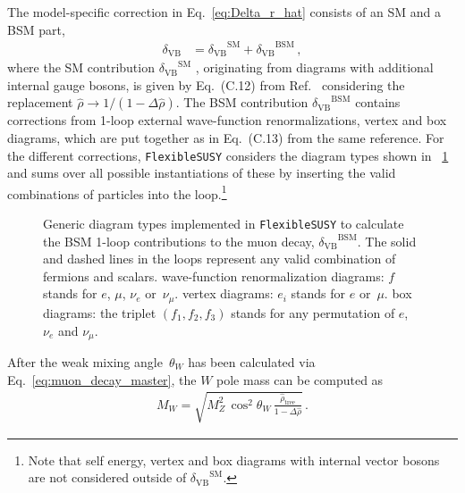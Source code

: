 \documentclass[final,3p,11pt,pdflatex]{elsarticle}
\makeatletter
\newcommand{\fs}{\texttt{FlexibleSUSY}\@\xspace}
\newcommand{\SM}{\ensuremath{\text{SM}}\xspace}
\newcommand{\BSM}{\ensuremath{\text{BSM}}\xspace}
\newcommand{\deltaVB}{\ensuremath{\delta_{\text{VB}}}\xspace}
\newcommand{\figref}[1]{\figurename~\ref{#1}}
\makeatother
\begin{document}
The model-specific correction in Eq.~\eqref{eq:Delta_r_hat}
consists of an SM and a BSM part,
%
\begin{align}
   \deltaVB &= \deltaVB^\SM + \deltaVB^\BSM\,,
\end{align}
%
where the SM contribution $\deltaVB^\SM$
\cite{Degrassi:1990tu}, originating
from diagrams with additional internal gauge bosons, is given by
Eq.~(C.12) from Ref.~\cite{Pierce:1996zz} considering the replacement
$\hat\rho \rightarrow 1/(1-\Delta\hat\rho)$.
The BSM contribution $\deltaVB^\BSM$ contains corrections from
1-loop external wave-function renormalizations, vertex and
box diagrams, which are put together as in Eq.~(C.13) from the
same reference. For the different corrections, \fs considers the
diagram types shown in \figref{fig:delta_VB_diagram_types} and sums
over all possible instantiations of these by inserting the valid
combinations of particles into the loop.\footnote{ Note that
self energy, vertex and box diagrams with internal vector bosons
are not considered outside of $\deltaVB^\SM$.}
%
\begin{figure}[tbh]
  \centering
  \caption{Generic diagram types implemented in \fs to calculate
  the BSM 1-loop contributions to the muon decay, $\deltaVB^\BSM$.
  The solid and dashed lines in the loops represent any valid
  combination of fermions and scalars.
  \protect{} wave-function
  renormalization diagrams: $f$ stands for $e$, $\mu$, $\nu_e$
  or~$\nu_\mu$.
  \protect{} vertex diagrams:
  $e_i$ stands for $e$ or~$\mu$.
  \protect{} box diagrams:
  the triplet $(f_1, f_2, f_3)$ stands for any permutation of
  $e$, $\nu_e$ and $\nu_\mu$.}
  \label{fig:delta_VB_diagram_types}
\end{figure}
%

After the weak mixing angle~$\theta_W$ has been calculated via
Eq.~\eqref{eq:muon_decay_master}, the $W$ pole mass can be
computed as
%
\begin{align}
   M_W = \sqrt{M_Z^2\,\cos^2\theta_W\,\frac{\hat\rho_\text{tree}}{1-\Delta\hat\rho}}\,.
   \label{eq:MW_calculation}
\end{align}
%
\end{document}
